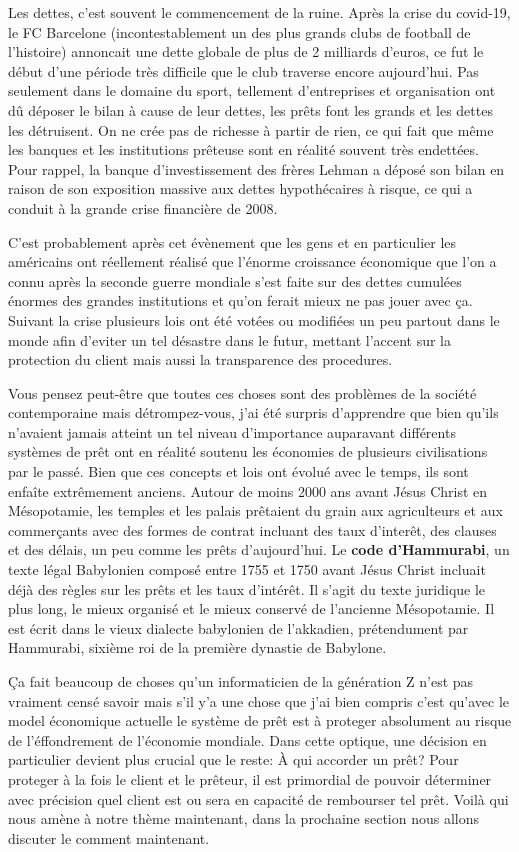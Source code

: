 Les dettes, c'est souvent le commencement de la ruine. Après la crise du covid-19, le FC Barcelone (incontestablement un des plus grands clubs de football de l'histoire) annoncait une dette globale de plus de 2 milliards d'euros, ce fut le début d'une période très difficile que le club traverse encore aujourd'hui. Pas seulement dans le domaine du sport, tellement d'entreprises et organisation ont dû déposer le bilan à cause de leur dettes, les prêts font les grands et les dettes les détruisent. On ne crée pas de richesse à partir de rien, ce qui fait que même les banques et les institutions prêteuse sont en réalité souvent très endettées. Pour rappel, la banque d'investissement des frères Lehman a déposé son bilan en raison de son exposition massive aux dettes hypothécaires à risque, ce qui a conduit à la grande crise financière de 2008.

C'est probablement après cet évènement que les gens et en particulier les américains ont réellement réalisé que l'énorme croissance économique que l'on a connu après la seconde guerre mondiale s'est faite sur des dettes cumulées énormes des grandes institutions et qu'on ferait mieux ne pas jouer avec ça. Suivant la crise plusieurs lois ont été votées ou modifiées un peu partout dans le monde afin d'eviter un tel désastre dans le futur, mettant l'accent sur la protection du client mais aussi la transparence des procedures.

Vous pensez peut-être que toutes ces choses sont des problèmes de la société contemporaine mais détrompez-vous, j'ai été surpris d'apprendre que bien qu'ils n'avaient jamais atteint un tel niveau d'importance auparavant différents systèmes de prêt ont en réalité soutenu les économies de plusieurs civilisations par le passé. Bien que ces concepts et lois ont évolué avec le temps, ils sont enfaîte extrêmement anciens. Autour de moins 2000 ans avant Jésus Christ en Mésopotamie, les temples et les palais prêtaient du grain aux agriculteurs et aux commerçants avec des formes de contrat incluant des taux d'interêt, des clauses et des délais, un peu comme les prêts d'aujourd'hui. Le \textbf{code d'Hammurabi}, un texte légal Babylonien composé entre 1755 et 1750 avant Jésus Christ incluait déjà des règles sur les prêts et les taux d'intérêt. Il s’agit du texte juridique le plus long, le mieux organisé et le mieux conservé de l’ancienne Mésopotamie. Il est écrit dans le vieux dialecte babylonien de l'akkadien, prétendument par Hammurabi, sixième roi de la première dynastie de Babylone.

Ça fait beaucoup de choses qu'un informaticien de la génération Z n'est pas vraiment censé savoir mais s'il y'a une chose que j'ai bien compris c'est qu'avec le model économique actuelle le système de prêt est à proteger absolument au risque de l'éffondrement de l'économie mondiale. Dans cette optique, une décision en particulier devient plus crucial que le reste: À qui accorder un prêt? Pour proteger à la fois le client et le prêteur, il est primordial de pouvoir déterminer avec précision quel client est ou sera en capacité de rembourser tel prêt. Voilà qui nous amène à notre thème maintenant, dans la prochaine section nous allons discuter le comment maintenant.